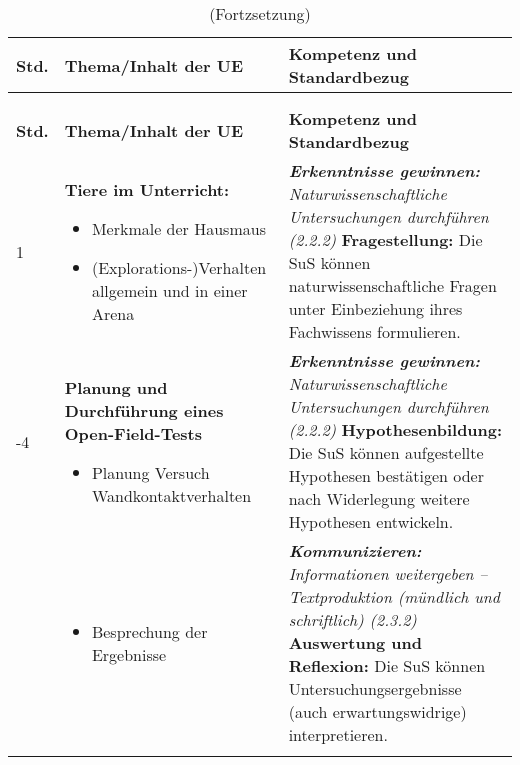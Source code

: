 \small
\begin{longtable}{lp{5cm}X}
\toprule
\textbf{Std.} &\textbf{Thema/Inhalt der UE} & \textbf{Kompetenz und Standardbezug} \\
\midrule \endfirsthead
\caption{(Fortzsetzung)}\\ \\
\toprule
\textbf{Std.} &\textbf{Thema/Inhalt der UE} & \textbf{Kompetenz und Standardbezug} \\
\midrule \endhead
1 & \textbf{Tiere im Unterricht:} 
	\begin{itemize}
		\item Merkmale der Hausmaus
		\item (Explorations-)Verhalten allgemein und in einer Arena
	\end{itemize} & 
	\textit{\textbf{Erkenntnisse gewinnen:} Naturwissenschaftliche Untersuchungen durchführen (2.2.2)}\newline
		\textbf{Fragestellung:} Die SuS können naturwissenschaftliche Fragen unter Einbeziehung ihres Fachwissens formulieren.
	 \\ \addlinespace[.5em]
2-4 & \textbf{Planung und Durchführung eines Open-Field-Tests}
	\begin{itemize}
		\item Planung Versuch Wandkontaktverhalten 
	\end{itemize} & 
	\textit{\textbf{Erkenntnisse gewinnen:} Naturwissenschaftliche Untersuchungen durchführen (2.2.2)}\newline
		\textbf{Hypothesenbildung:} Die SuS können aufgestellte Hypothesen bestätigen oder nach Widerlegung weitere Hypothesen entwickeln.
	\\ \addlinespace[.5em]
5 & \begin{itemize}
		\item Besprechung der Ergebnisse
	\end{itemize} &  
	\textit{\textbf{Kommunizieren:} Informationen weitergeben – Textproduktion (mündlich und schriftlich) (2.3.2)}\newline
		\textbf{Auswertung und Reflexion:} Die SuS können Untersuchungsergebnisse (auch erwartungswidrige) interpretieren.
	\\ \addlinespace[.5em] \rowcolor{lightgray}

\end{longtable}
